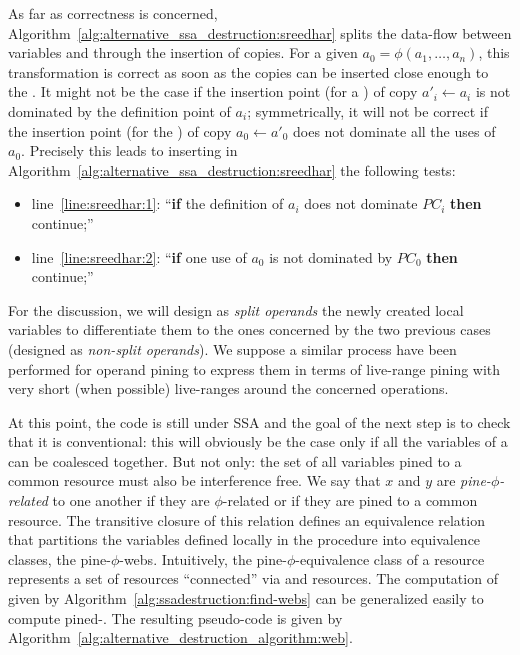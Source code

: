 As far as correctness is concerned, Algorithm~\ref{alg:alternative_ssa_destruction:sreedhar} splits the data-flow between variables and \phinodes through the insertion of copies. For a given \phifun $a_0=\phi(a_1,\dots,a_n)$, this transformation is correct as soon as the copies can be inserted close enough to the \phifun. It might not be the case if the insertion point (for a \useop) of copy $a'_i\gets a_i$ is not dominated by the definition point of $a_i$; symmetrically, it will not be correct if the insertion point (for the ) of copy $a_0\gets a'_0$ does not dominate all the uses of $a_0$. Precisely this leads to inserting in Algorithm~\ref{alg:alternative_ssa_destruction:sreedhar} the following tests:
\begin{itemize}
\item line~\ref{line:sreedhar:1}: ``{\bf if} the definition of $a_i$ does not dominate $PC_i$ {\bf then} continue;''
\item line~\ref{line:sreedhar:2}: ``{\bf if} one use of $a_0$ is not dominated by $PC_0$ {\bf then} continue;''
\end{itemize}
For the discussion, we will design as \emph{split operands} the newly created local variables to differentiate them to the ones concerned by the two previous cases (designed as \emph{non-split operands}).
% 
We suppose a similar process have been performed for operand pining to express them in terms of live-range pining with very short (when possible) live-ranges around the concerned operations. 

At this point, the code is still under SSA and the goal of the next step is to check that it is conventional: this will obviously be the case only if all the variables of a \phiweb can be coalesced together. But not only: the set of all variables pined to a common resource must also be interference free. 
We say that $x$ and $y$ are \emph{pine-$\phi$-related} to one another if they are $\phi$-related or if they are pined to a common resource. The transitive closure of this relation defines an equivalence relation that 
partitions the variables defined locally in the procedure into equivalence classes, the pine-$\phi$-webs.
Intuitively, the pine-$\phi$-equivalence class of a resource represents a set of resources ``connected'' via \phifuns and resources.
The computation of \phiwebs given by Algorithm~\ref{alg:ssadestruction:find-webs} can be generalized easily to compute pined-\phiwebs. The resulting pseudo-code is given by Algorithm~\ref{alg:alternative_destruction_algorithm:web}. 

